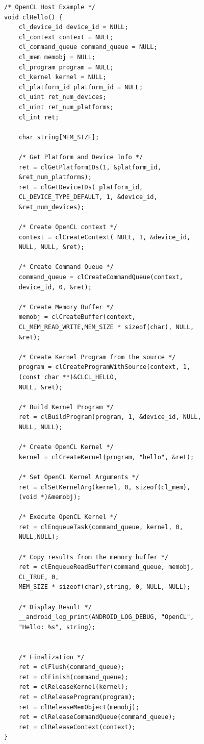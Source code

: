 \begin{lstlisting}[frame=single]
/* OpenCL Host Example */
void clHello() {
    cl_device_id device_id = NULL;
    cl_context context = NULL;
    cl_command_queue command_queue = NULL;
    cl_mem memobj = NULL;
    cl_program program = NULL;
    cl_kernel kernel = NULL;
    cl_platform_id platform_id = NULL;
    cl_uint ret_num_devices;
    cl_uint ret_num_platforms;
    cl_int ret;

    char string[MEM_SIZE];

    /* Get Platform and Device Info */
    ret = clGetPlatformIDs(1, &platform_id, 
    &ret_num_platforms);
    ret = clGetDeviceIDs( platform_id, 
    CL_DEVICE_TYPE_DEFAULT, 1, &device_id, 
    &ret_num_devices);

    /* Create OpenCL context */
    context = clCreateContext( NULL, 1, &device_id, 
    NULL, NULL, &ret);

    /* Create Command Queue */
    command_queue = clCreateCommandQueue(context, 
    device_id, 0, &ret);

    /* Create Memory Buffer */
    memobj = clCreateBuffer(context, 
    CL_MEM_READ_WRITE,MEM_SIZE * sizeof(char), NULL, 
    &ret);

    /* Create Kernel Program from the source */
    program = clCreateProgramWithSource(context, 1, 
    (const char **)&CLCL_HELLO,
    NULL, &ret);

    /* Build Kernel Program */
    ret = clBuildProgram(program, 1, &device_id, NULL, 
    NULL, NULL);

    /* Create OpenCL Kernel */
    kernel = clCreateKernel(program, "hello", &ret);

    /* Set OpenCL Kernel Arguments */
    ret = clSetKernelArg(kernel, 0, sizeof(cl_mem), 
    (void *)&memobj);

    /* Execute OpenCL Kernel */
    ret = clEnqueueTask(command_queue, kernel, 0, 
    NULL,NULL);

    /* Copy results from the memory buffer */
    ret = clEnqueueReadBuffer(command_queue, memobj, 
    CL_TRUE, 0,
    MEM_SIZE * sizeof(char),string, 0, NULL, NULL);

    /* Display Result */
    __android_log_print(ANDROID_LOG_DEBUG, "OpenCL", 
    "Hello: %s", string);


    /* Finalization */
    ret = clFlush(command_queue);
    ret = clFinish(command_queue);
    ret = clReleaseKernel(kernel);
    ret = clReleaseProgram(program);
    ret = clReleaseMemObject(memobj);
    ret = clReleaseCommandQueue(command_queue);
    ret = clReleaseContext(context);
}
\end{lstlisting}

